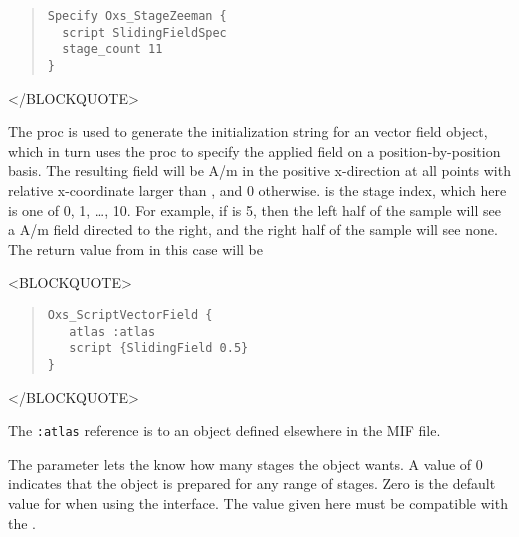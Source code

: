 \begin{itemize}
\begin{description}
\begin{quote}
\begin{verbatim}
Specify Oxs_StageZeeman {
  script SlidingFieldSpec
  stage_count 11
}
\end{verbatim}
\end{quote}
\begin{rawhtml}</BLOCKQUOTE>\end{rawhtml}

   The  proc is used to generate the initialization
   string for an  vector field object, which
   in turn uses the  proc to specify the applied field
   on a position-by-position basis.  The resulting field will be
    A/m in the positive x-direction at
   all points with relative x-coordinate larger than ,
   and 0 otherwise.   is the stage index, which here is
   one of 0, 1, \ldots, 10.  For example, if  is 5, then the
   left half of the sample will see a 
   A/m field directed to the right, and the right half of the sample
   will see none.  The return value from  in this
   case will be
\begin{rawhtml}<BLOCKQUOTE>\end{rawhtml}
\begin{quote}
\begin{verbatim}
Oxs_ScriptVectorField {
   atlas :atlas
   script {SlidingField 0.5}
}
\end{verbatim}
\end{quote}
\begin{rawhtml}</BLOCKQUOTE>\end{rawhtml}
   The \verb+:atlas+ reference is to an  object defined
   elsewhere in the MIF file.

   The  parameter lets the
    know how many stages the
    object wants.  A value of 0 indicates that the
   object is prepared for any range of stages.  Zero is the default
   value for  when using the 
   interface.  The  value given here must be compatible
   with the .


\end{description}
\end{itemize}

